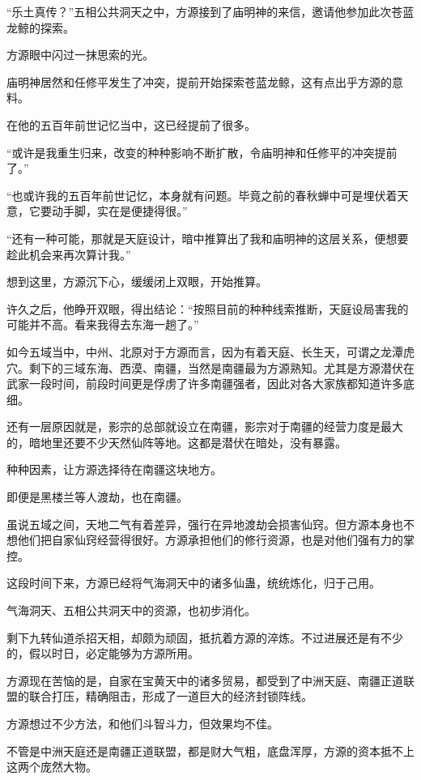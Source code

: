 
\begin{this_body}

“乐土真传？”五相公共洞天之中，方源接到了庙明神的来信，邀请他参加此次苍蓝龙鲸的探索。

方源眼中闪过一抹思索的光。

庙明神居然和任修平发生了冲突，提前开始探索苍蓝龙鲸，这有点出乎方源的意料。

在他的五百年前世记忆当中，这已经提前了很多。

“或许是我重生归来，改变的种种影响不断扩散，令庙明神和任修平的冲突提前了。”

“也或许我的五百年前世记忆，本身就有问题。毕竟之前的春秋蝉中可是埋伏着天意，它要动手脚，实在是便捷得很。”

“还有一种可能，那就是天庭设计，暗中推算出了我和庙明神的这层关系，便想要趁此机会来再次算计我。”

想到这里，方源沉下心，缓缓闭上双眼，开始推算。

许久之后，他睁开双眼，得出结论：“按照目前的种种线索推断，天庭设局害我的可能并不高。看来我得去东海一趟了。”

如今五域当中，中州、北原对于方源而言，因为有着天庭、长生天，可谓之龙潭虎穴。剩下的三域东海、西漠、南疆，当然是南疆最为方源熟知。尤其是方源潜伏在武家一段时间，前段时间更是俘虏了许多南疆强者，因此对各大家族都知道许多底细。

还有一层原因就是，影宗的总部就设立在南疆，影宗对于南疆的经营力度是最大的，暗地里还要不少天然仙阵等地。这都是潜伏在暗处，没有暴露。

种种因素，让方源选择待在南疆这块地方。

即便是黑楼兰等人渡劫，也在南疆。

虽说五域之间，天地二气有着差异，强行在异地渡劫会损害仙窍。但方源本身也不想他们把自家仙窍经营得很好。方源承担他们的修行资源，也是对他们强有力的掌控。

这段时间下来，方源已经将气海洞天中的诸多仙蛊，统统炼化，归于己用。

气海洞天、五相公共洞天中的资源，也初步消化。

剩下九转仙道杀招天相，却颇为顽固，抵抗着方源的淬炼。不过进展还是有不少的，假以时日，必定能够为方源所用。

方源现在苦恼的是，自家在宝黄天中的诸多贸易，都受到了中洲天庭、南疆正道联盟的联合打压，精确阻击，形成了一道巨大的经济封锁阵线。

方源想过不少方法，和他们斗智斗力，但效果均不佳。

不管是中洲天庭还是南疆正道联盟，都是财大气粗，底盘浑厚，方源的资本抵不上这两个庞然大物。


\end{this_body}
